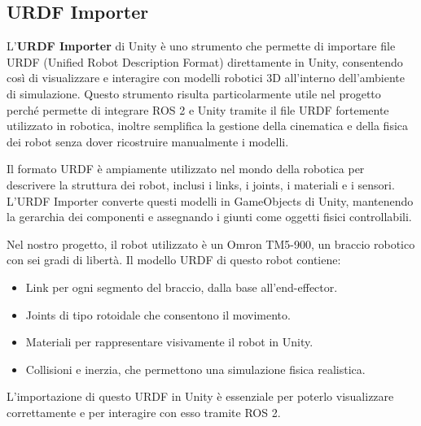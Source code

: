 \documentclass[11pt]{report}
\begin{document}
\subsection{URDF Importer}
\label{sec:urdf_importer}
L'\textbf{URDF Importer} \cite{URDF-Importer} di Unity è uno strumento che permette di importare file URDF (Unified Robot Description Format) direttamente in Unity, consentendo così di visualizzare e interagire con modelli robotici 3D all'interno dell'ambiente di simulazione. Questo strumento risulta particolarmente utile nel progetto perché permette di integrare ROS 2 e Unity tramite il file URDF fortemente utilizzato in robotica, inoltre semplifica la gestione della cinematica e della fisica dei robot senza dover ricostruire manualmente i modelli.

Il formato URDF è ampiamente utilizzato nel mondo della robotica per descrivere la struttura dei robot, inclusi i links, i joints, i materiali e i sensori. L'URDF Importer converte questi modelli in GameObjects di Unity, mantenendo la gerarchia dei componenti e assegnando i giunti come oggetti fisici controllabili.

Nel nostro progetto, il robot utilizzato è un Omron TM5-900, un braccio robotico con sei gradi di libertà. Il modello URDF di questo robot contiene:
\begin{itemize}
    \item Link per ogni segmento del braccio, dalla base all'end-effector.
    \item Joints di tipo rotoidale che consentono il movimento.
    \item Materiali per rappresentare visivamente il robot in Unity.
    \item Collisioni e inerzia, che permettono una simulazione fisica realistica.
\end{itemize}

L'importazione di questo URDF in Unity è essenziale per poterlo visualizzare correttamente e per interagire con esso tramite ROS 2.
\end{document}
